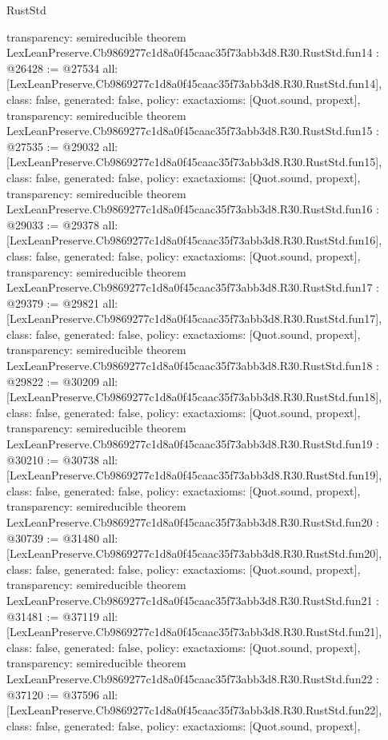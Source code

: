 \begin{lexlean}{RustStd}
\begin{coremodule}
{  transparency: semireducible
}
theorem LexLeanPreserve.Cb9869277c1d8a0f45caac35f73abb3d8.R30.RustStd.fun14 : @26428 := @27534 {
  all: [LexLeanPreserve.Cb9869277c1d8a0f45caac35f73abb3d8.R30.RustStd.fun14],
  class: false,
  generated: false,
  policy: exact{axioms: [Quot.sound, propext]},
  transparency: semireducible
}
theorem LexLeanPreserve.Cb9869277c1d8a0f45caac35f73abb3d8.R30.RustStd.fun15 : @27535 := @29032 {
  all: [LexLeanPreserve.Cb9869277c1d8a0f45caac35f73abb3d8.R30.RustStd.fun15],
  class: false,
  generated: false,
  policy: exact{axioms: [Quot.sound, propext]},
  transparency: semireducible
}
theorem LexLeanPreserve.Cb9869277c1d8a0f45caac35f73abb3d8.R30.RustStd.fun16 : @29033 := @29378 {
  all: [LexLeanPreserve.Cb9869277c1d8a0f45caac35f73abb3d8.R30.RustStd.fun16],
  class: false,
  generated: false,
  policy: exact{axioms: [Quot.sound, propext]},
  transparency: semireducible
}
theorem LexLeanPreserve.Cb9869277c1d8a0f45caac35f73abb3d8.R30.RustStd.fun17 : @29379 := @29821 {
  all: [LexLeanPreserve.Cb9869277c1d8a0f45caac35f73abb3d8.R30.RustStd.fun17],
  class: false,
  generated: false,
  policy: exact{axioms: [Quot.sound, propext]},
  transparency: semireducible
}
theorem LexLeanPreserve.Cb9869277c1d8a0f45caac35f73abb3d8.R30.RustStd.fun18 : @29822 := @30209 {
  all: [LexLeanPreserve.Cb9869277c1d8a0f45caac35f73abb3d8.R30.RustStd.fun18],
  class: false,
  generated: false,
  policy: exact{axioms: [Quot.sound, propext]},
  transparency: semireducible
}
theorem LexLeanPreserve.Cb9869277c1d8a0f45caac35f73abb3d8.R30.RustStd.fun19 : @30210 := @30738 {
  all: [LexLeanPreserve.Cb9869277c1d8a0f45caac35f73abb3d8.R30.RustStd.fun19],
  class: false,
  generated: false,
  policy: exact{axioms: [Quot.sound, propext]},
  transparency: semireducible
}
theorem LexLeanPreserve.Cb9869277c1d8a0f45caac35f73abb3d8.R30.RustStd.fun20 : @30739 := @31480 {
  all: [LexLeanPreserve.Cb9869277c1d8a0f45caac35f73abb3d8.R30.RustStd.fun20],
  class: false,
  generated: false,
  policy: exact{axioms: [Quot.sound, propext]},
  transparency: semireducible
}
theorem LexLeanPreserve.Cb9869277c1d8a0f45caac35f73abb3d8.R30.RustStd.fun21 : @31481 := @37119 {
  all: [LexLeanPreserve.Cb9869277c1d8a0f45caac35f73abb3d8.R30.RustStd.fun21],
  class: false,
  generated: false,
  policy: exact{axioms: [Quot.sound, propext]},
  transparency: semireducible
}
theorem LexLeanPreserve.Cb9869277c1d8a0f45caac35f73abb3d8.R30.RustStd.fun22 : @37120 := @37596 {
  all: [LexLeanPreserve.Cb9869277c1d8a0f45caac35f73abb3d8.R30.RustStd.fun22],
  class: false,
  generated: false,
  policy: exact{axioms: [Quot.sound, propext]},
}
\end{coremodule}
\end{lexlean}
